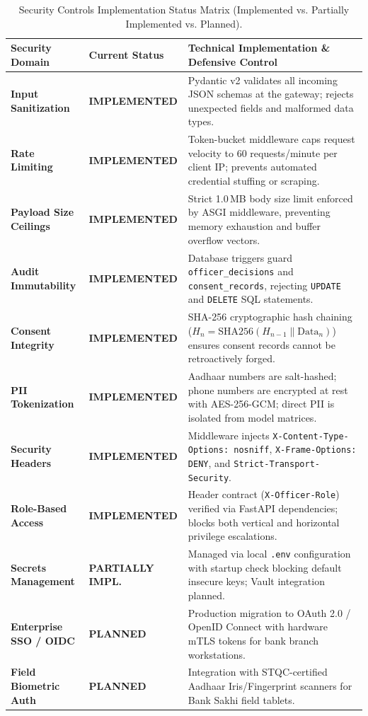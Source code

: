 \documentclass[11pt,a4paper,oneside]{report}
\begin{document}
\begin{table}[H]
\centering
\small
\renewcommand{\arraystretch}{1.2}
\begin{tabularx}{\textwidth}{p{3.2cm} p{3.2cm} X}
  \toprule
  \textbf{Security Domain} & \textbf{Current Status} & \textbf{Technical Implementation \& Defensive Control} \\
  \midrule
  \textbf{Input Sanitization} & \textbf{IMPLEMENTED} & Pydantic v2 validates all incoming JSON schemas at the gateway; rejects unexpected fields and malformed data types. \\
  \addlinespace
  \textbf{Rate Limiting} & \textbf{IMPLEMENTED} & Token-bucket middleware caps request velocity to 60 requests/minute per client IP; prevents automated credential stuffing or scraping. \\
  \addlinespace
  \textbf{Payload Size Ceilings} & \textbf{IMPLEMENTED} & Strict 1.0\,MB body size limit enforced by ASGI middleware, preventing memory exhaustion and buffer overflow vectors. \\
  \addlinespace
  \textbf{Audit Immutability} & \textbf{IMPLEMENTED} & Database triggers guard \texttt{officer\_decisions} and \texttt{consent\_records}, rejecting \texttt{UPDATE} and \texttt{DELETE} SQL statements. \\
  \addlinespace
  \textbf{Consent Integrity} & \textbf{IMPLEMENTED} & SHA-256 cryptographic hash chaining ($H_n = \text{SHA256}(H_{n-1} \parallel \text{Data}_n)$) ensures consent records cannot be retroactively forged. \\
  \addlinespace
  \textbf{PII Tokenization} & \textbf{IMPLEMENTED} & Aadhaar numbers are salt-hashed; phone numbers are encrypted at rest with AES-256-GCM; direct PII is isolated from model matrices. \\
  \addlinespace
  \textbf{Security Headers} & \textbf{IMPLEMENTED} & Middleware injects \texttt{X-Content-Type-Options: nosniff}, \texttt{X-Frame-Options: DENY}, and \texttt{Strict-Transport-Security}. \\
  \addlinespace
  \textbf{Role-Based Access} & \textbf{IMPLEMENTED} & Header contract (\texttt{X-Officer-Role}) verified via FastAPI dependencies; blocks both vertical and horizontal privilege escalations. \\
  \addlinespace
  \textbf{Secrets Management} & \textbf{PARTIALLY IMPL.} & Managed via local \texttt{.env} configuration with startup check blocking default insecure keys; Vault integration planned. \\
  \addlinespace
  \textbf{Enterprise SSO / OIDC} & \textbf{PLANNED} & Production migration to OAuth 2.0 / OpenID Connect with hardware mTLS tokens for bank branch workstations. \\
  \addlinespace
  \textbf{Field Biometric Auth} & \textbf{PLANNED} & Integration with STQC-certified Aadhaar Iris/Fingerprint scanners for Bank Sakhi field tablets. \\
  \bottomrule
\end{tabularx}
\caption{Security Controls Implementation Status Matrix (Implemented vs. Partially Implemented vs. Planned).}
\label{tab:security_controls_status}
\end{table}
\end{document}
